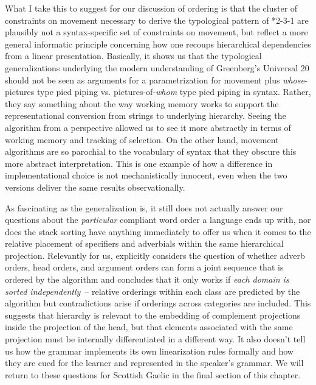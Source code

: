 \documentclass[output=paper,colorlinks,citecolor=brown]{langscibook}
\begin{document}
What I take this to suggest for our discussion of ordering is that the cluster of constraints on movement necessary to derive the typological pattern of *2-3-1  are plausibly not a syntax-specific set of constraints on movement, but reflect a more general informatic principle concerning how one recoups hierarchical dependencies from a linear presentation.   Basically, it shows us that the typological generalizations underlying the modern understanding of Greenberg's Universal 20 should not be seen as  arguments for a parametrization for movement plus \textit{whose}-pictures type pied piping vs. pictures-of-\textit{whom} type pied piping in syntax.   Rather, they say something about the way working memory works to support the representational conversion from strings to underlying hierarchy.  Seeing the algorithm from a  perspective allowed us to see it more abstractly in terms of working memory and tracking of selection. On the other hand, movement algorithms are so parochial to the vocabulary of syntax that they obscure this more abstract interpretation.  This is one example of how a difference in implementational choice is not mechanistically innocent, even when the two versions deliver the same results observationally. 

As fascinating as the  generalization is, it still does not actually answer our questions about the \textit{particular}  compliant word order a language ends up with, nor does the stack sorting have anything immediately to offer us when it comes to the relative placement of specifiers and adverbials within the same hierarchical projection. Relevantly for us, \citet{abels16b} explicitly considers the question of whether adverb orders, head orders, and argument orders can form a joint sequence that is ordered by the algorithm and concludes that it only works if \textit{each domain is sorted independently}~-- relative orderings within each class are predicted by the algorithm but contradictions arise if orderings across categories are included. This suggests that hierarchy is relevant to the embedding of complement projections inside the projection of the head, but that elements associated with the same projection must be internally differentiated in a different way. It also doesn't tell us how the grammar implements its own linearization rules formally and how they are cued for the learner and represented in the speaker's grammar. We will return to these questions for Scottish Gaelic in the final section of this chapter. 
\end{document}
